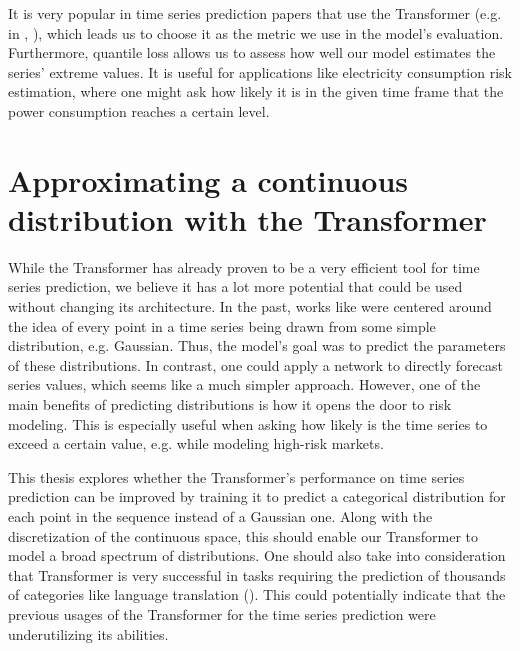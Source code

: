 \documentclass[en]{pracamgr}
\newcommand{\pk}[1]{\textcolor{red}{\small [pk: #1]}}
\begin{document}
	It is very popular in time series prediction papers that use the Transformer (e.g. in \cite{enhancing}, \cite{deepar}), which leads us to choose it as the metric we use in the model's evaluation. Furthermore, quantile loss allows us to assess how well our model estimates the series' extreme values. It is useful for applications like electricity consumption risk estimation, where one might ask how likely it is in the given time frame that the power consumption reaches a certain level.
	
	\chapter{Approximating a continuous distribution with the Transformer}
	
	While the Transformer has already proven to be a very efficient tool for time series prediction, we believe it has a lot more potential that could be used without changing its architecture. In the past, works like \cite{enhancing} were centered around the idea of every point in a time series being drawn from some simple distribution, e.g. Gaussian. Thus, the model's goal was to predict the parameters of these distributions.
	In contrast, one could apply a network to directly forecast series values, which seems like a much simpler approach. However, one of the main benefits of predicting distributions is how it opens the door to risk modeling. This is especially useful when asking how likely is the time series to exceed a certain value, e.g. while modeling high-risk markets.
	
	This thesis explores whether the Transformer's performance on time series prediction can be improved by training it to predict a categorical distribution for each point in the sequence instead of a Gaussian one. 
	Along with the discretization of the continuous space,
	this should enable our Transformer to model a broad spectrum of distributions. One should also take into consideration that Transformer is very successful in tasks requiring the prediction of thousands of categories like language translation (\cite{tr}). This could potentially indicate that the previous usages of the Transformer for the time series prediction were underutilizing its abilities.
	
	
	
\end{document}
